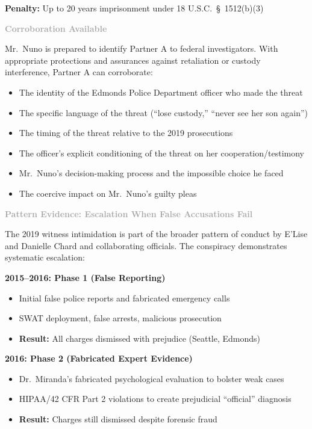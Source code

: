 \documentclass[11pt, letterpaper]{article}
\newcommand{\subsubsectiontitle}[1]{\vspace{0.1in}\noindent\textcolor{DarkGray}{\textbf{#1}}\vspace{0.05in}}
\begin{document}
\textbf{Penalty:} Up to 20 years imprisonment under 18 U.S.C.\ \S\ 1512(b)(3)

\subsubsectiontitle{Corroboration Available}

Mr.\ Nuno is prepared to identify Partner A to federal investigators. With appropriate protections and assurances against retaliation or custody interference, Partner A can corroborate:
\begin{itemize}[leftmargin=*,itemsep=2pt]
    \item The identity of the Edmonds Police Department officer who made the threat
    \item The specific language of the threat (``lose custody,'' ``never see her son again'')
    \item The timing of the threat relative to the 2019 prosecutions
    \item The officer's explicit conditioning of the threat on her cooperation/testimony
    \item Mr.\ Nuno's decision-making process and the impossible choice he faced
    \item The coercive impact on Mr.\ Nuno's guilty pleas
\end{itemize}

\subsubsectiontitle{Pattern Evidence: Escalation When False Accusations Fail}

The 2019 witness intimidation is part of the broader pattern of conduct by E'Lise and Danielle Chard and collaborating officials. The conspiracy demonstrates systematic escalation:

\textbf{2015--2016: Phase 1 (False Reporting)}
\begin{itemize}[leftmargin=*,itemsep=2pt]
    \item Initial false police reports and fabricated emergency calls
    \item SWAT deployment, false arrests, malicious prosecution
    \item \textbf{Result:} All charges dismissed with prejudice (Seattle, Edmonds)
\end{itemize}

\textbf{2016: Phase 2 (Fabricated Expert Evidence)}
\begin{itemize}[leftmargin=*,itemsep=2pt]
    \item Dr.\ Miranda's fabricated psychological evaluation to bolster weak cases
    \item HIPAA/42 CFR Part 2 violations to create prejudicial ``official'' diagnosis
    \item \textbf{Result:} Charges still dismissed despite forensic fraud
\end{itemize}
\end{document}
